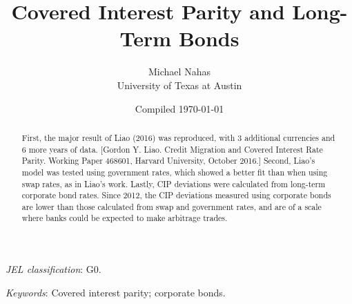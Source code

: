 \documentclass[12pt]{article}
\begin{document}

\title{Covered Interest Parity and Long-Term Bonds}

\author{Michael Nahas \\ University of Texas at Austin}

\date{Compiled \today}


\renewcommand{\thefootnote}{\fnsymbol{footnote}}

\singlespacing

\maketitle

\vspace{-.2in}
\begin{abstract}
\noindent First, the major result of Liao (2016) was reproduced, with 3 additional currencies and 6 more years of data.  [Gordon Y. Liao. Credit Migration and Covered Interest Rate Parity. Working Paper 468601, Harvard University, October 2016.]   Second, Liao's model was tested using government rates, which showed a better fit than when using swap rates, as in Liao's work.  Lastly, CIP deviations were calculated from long-term corporate bond rates.  Since 2012, the CIP deviations measured using corporate bonds are lower than those calculated from swap and government rates, and are of a scale where banks could be expected to make arbitrage trades.  
\end{abstract}

\medskip

\noindent \textit{JEL classification}: G0.

\medskip
\noindent \textit{Keywords}: Covered interest parity; corporate bonds.

\thispagestyle{empty}

\clearpage

\onehalfspacing
\setcounter{footnote}{0}
\renewcommand{\thefootnote}{\arabic{footnote}}
\setcounter{page}{1}



\clearpage


\appendix



\clearpage 



\clearpage 




\clearpage 




\end{document}
